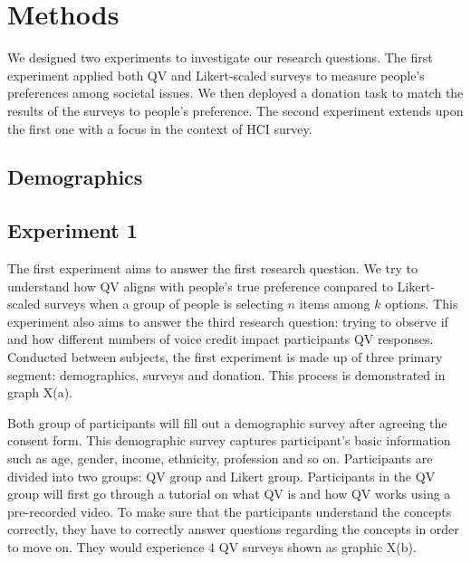 \section{Methods}
We designed two experiments to investigate our research questions.
The first experiment applied both QV and Likert-scaled surveys to 
measure people's preferences among societal issues.
We then deployed a donation task to match the results of the surveys to people's preference. 
The second experiment extends upon the first one with a focus
in the context of HCI survey.\par

\subsection{Demographics}

\subsection{Experiment 1}
The first experiment aims to answer the first research question. 
We try to understand how QV aligns with people's true preference
compared to Likert-scaled surveys 
when a group of people is selecting $n$ items among $k$ options.
This experiment also aims to answer the third research question:  
trying to observe if and how different numbers of voice credit 
impact participants QV responses.
Conducted between subjects, 
the first experiment is made up of three primary segment: 
demographics, surveys and donation. This process is demonstrated in graph X(a).\par

Both group of participants will fill out a demographic survey
after agreeing the consent form.
This demographic survey captures participant's basic information 
such as age, gender, income, ethnicity, profession and so on. 
Participants are divided into two groups: QV group and Likert group.
Participants in the QV group 
will first go through a tutorial on what QV is 
and how QV works using a pre-recorded video. 
To make sure that the participants understand the concepts correctly,
they have to correctly answer questions regarding the concepts
in order to move on. 
They would experience 4 QV surveys shown as graphic X(b).\par

